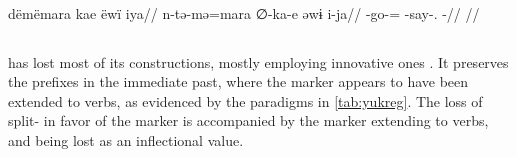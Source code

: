 \carijo {}\\
\begingl
\glpreamble dëmëmara kae ëwï iya//
\gla n-tə-mə=mara ∅-ka-e əwɨ i-ja//
\glb {}-go-= -say-.  -//
\glft {}//
\endgl
\xe

%
%
%

\subsection{\yukpa {}}
\label{sec:yukpa}
\yukpa has lost most of its \setone constructions, mostly employing innovative ones \parencite{meira2006syntactic}.
It preserves the \setone prefixes in the immediate past, where the  marker appears to have been extended to  verbs, as evidenced by the paradigms in \cref{tab:yukreg}.
The loss of split- in favor of the  marker is accompanied by the  marker  extending to  verbs, and  being lost as an inflectional value.


